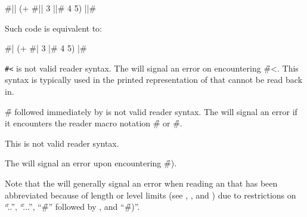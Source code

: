 \code
 #|| (+ #|| 3 ||# 4 5) ||# 
\endcode

Such code is equivalent to:

\code
 #| (+ #| 3 |# 4 5) |#
\endcode

\endsubsubsubsection%

\endsubsubsection%



{\tt  \#<} is not valid reader syntax.
The  will signal an error 
on encountering \f{\#<}.
This syntax is typically used in the printed representation 
of  that cannot be read back in.  

\endsubsubsection%




\f{\#} followed immediately by  is not valid reader syntax.
The  will signal an error  if it
encounters the reader macro notation \f{\#\NewlineChar} or \f{\#\SpaceChar}.

\endsubsubsection%



This is not valid reader syntax.

The  will signal an error 
upon encountering \f{\#)}.

\endsubsubsection%

\endsubsection%


Note that the  will 
generally
signal an error 
when reading an  that has been
abbreviated because of length or level limits 
(see ,
     ,
 and )
due to restrictions on ``\f{..}'', ``\f{...}'', ``\f{\#}'' followed by ,
and ``\f{\#)}''.

\endsubsection%
